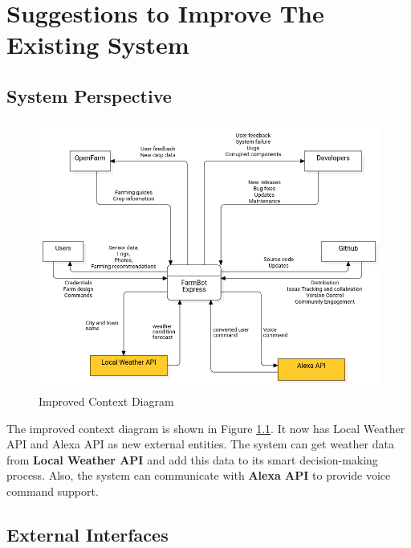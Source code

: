 \chapter{Suggestions to Improve The Existing System} \label{suggestions}

\section{System Perspective}

\begin{figure}[H]
    \centering
    \includegraphics[width=1\textwidth]{UML Diagrams/SuggestedContextDiagram.png}
    \caption{Improved Context Diagram}
    \label{fig:suggested_context}
\end{figure}
The improved context diagram is shown in Figure \ref{fig:suggested_context}.
It now has Local Weather API and Alexa API as new external entities. The system can get weather data from \textbf{Local Weather API} and add this data to its smart decision-making process. Also, the system can communicate with \textbf{Alexa API} to provide voice command support. 

\section{External Interfaces}

